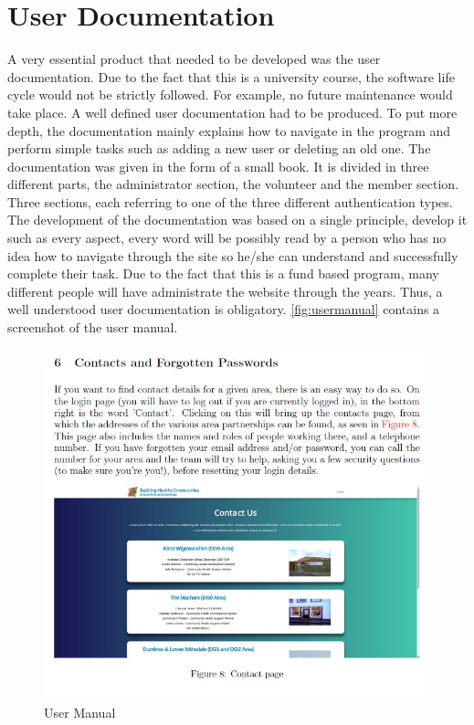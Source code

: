 \documentclass{l3proj}
\begin{document}
\section{User Documentation}
\label{sec:user_doc}
A very essential product that needed to be developed was the user documentation. Due to the fact that this is a university course, the software life cycle would not be strictly followed. For example, no future maintenance would take place. A well defined user documentation had to be produced. To put more depth, the documentation mainly explains how to navigate in the program and perform simple tasks such as adding a new user or deleting an old one. The documentation was given in the form of a small book. It is divided in three different parts, the administrator section, the volunteer and the member section. Three sections, each referring to one of the three different authentication types. The development of the documentation was based on a single principle, develop it such as every aspect, every word will be possibly read by a person who has no idea how to navigate through the site so he/she can understand and successfully complete their task. Due to the fact that this is a fund based program, many different people will have administrate the website through the years. Thus, a well understood user documentation is obligatory.
\autoref{fig:usermanual} contains a screenshot of the user manual.

\begin{figure}[h]
\centerline{\includegraphics[width=\textwidth, height=\textheight, keepaspectratio]{usermanual.jpg}}
\caption{User Manual }
 \label{fig:usermanual}
\end{figure}
\end{document}
